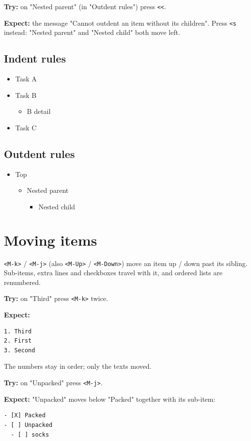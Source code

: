 \textbf{Try:} on "Nested parent" (in "Outdent rules") press \texttt{<{}<{}}.

\textbf{Expect:} the message "Cannot outdent an item without its children".
Press \texttt{<s} instead: "Nested parent" and "Nested child" both move left.
\subsection{Indent rules}
\label{sec:orgffe733b}
\begin{itemize}
\item Task A
\item Task B
\begin{itemize}
\item B detail
\end{itemize}
\item Task C
\end{itemize}
\subsection{Outdent rules}
\label{sec:org765f93b}
\begin{itemize}
\item Top
\begin{itemize}
\item Nested parent
\begin{itemize}
\item Nested child
\end{itemize}
\end{itemize}
\end{itemize}
\section{Moving items}
\label{sec:org4f04a7e}
\texttt{<M-k>} / \texttt{<M-j>} (also \texttt{<M-Up>} / \texttt{<M-Down>}) move an item up / down past
its sibling. Sub-items, extra lines and checkboxes travel with it, and
ordered lists are renumbered.

\textbf{Try:} on "Third" press \texttt{<M-k>} twice.

\textbf{Expect:}
\begin{verbatim}
1. Third
2. First
3. Second
\end{verbatim}
The numbers stay in order; only the texts moved.

\textbf{Try:} on "Unpacked" press \texttt{<M-j>}.

\textbf{Expect:} "Unpacked" moves below "Packed" together with its sub-item:
\begin{verbatim}
- [X] Packed
- [ ] Unpacked
  - [ ] socks
\end{verbatim}

